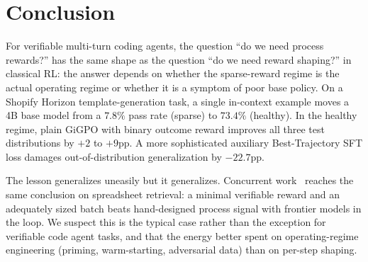 \documentclass[10pt]{article}
\begin{document}
\section{Conclusion}
\label{sec:conclusion}

For verifiable multi-turn coding agents, the question ``do we need
process rewards?'' has the same shape as the question ``do we need
reward shaping?'' in classical RL: the answer depends on whether the
sparse-reward regime is the actual operating regime or whether it is a
symptom of poor base policy. On a Shopify Horizon template-generation
task, a single in-context example moves a 4B base model from a
$7.8\%$ pass rate (sparse) to $73.4\%$ (healthy). In the healthy regime,
plain GiGPO with binary outcome reward improves all three test
distributions by $+2$ to $+9$pp. A more sophisticated auxiliary
Best-Trajectory SFT loss damages out-of-distribution generalization
by $-22.7$pp.

The lesson generalizes uneasily but it generalizes. Concurrent
work~\cite{ramp2026fastask} reaches the same conclusion on
spreadsheet retrieval: a minimal verifiable reward and an adequately
sized batch beats hand-designed process signal with frontier models
in the loop. We suspect this is the typical case rather than the
exception for verifiable code agent tasks, and that the energy
better spent on operating-regime engineering (priming, warm-starting,
adversarial data) than on per-step shaping.
\end{document}

